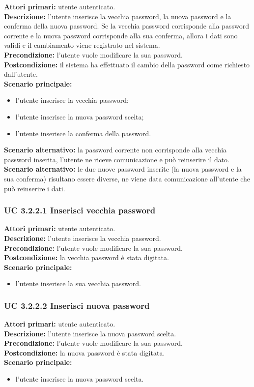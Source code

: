 \noindent
\textbf{Attori primari:} utente autenticato.\\
\textbf{Descrizione:} l'utente inserisce la vecchia password, la nuova password e la conferma della nuova password. Se la vecchia password corrisponde alla password corrente e la nuova password corrisponde alla sua conferma, allora i dati sono validi e il cambiamento viene registrato nel sistema.\\
\textbf{Precondizione:} l'utente vuole modificare la sua password.\\
\textbf{Postcondizione:} il sistema ha effettuato il cambio della password come richiesto dall'utente.\\
\textbf{Scenario principale:}
\begin{itemize}
\item l'utente inserisce la vecchia password;
\item l'utente inserisce la nuova password scelta;
\item l'utente inserisce la conferma della password.
\end{itemize}
\textbf{Scenario alternativo: }la password corrente non corrisponde alla vecchia password inserita, l'utente ne riceve comunicazione e può reinserire il dato.\\
\textbf{Scenario alternativo:} le due nuove password inserite (la nuova password e la sua conferma) risultano essere diverse, ne viene data comunicazione all'utente che può reinserire i dati.

\subsubsection{UC 3.2.2.1 Inserisci vecchia password}
\noindent
\textbf{Attori primari:} utente autenticato.\\
\textbf{Descrizione:} l'utente inserisce la vecchia password.\\
\textbf{Precondizione:} l'utente vuole modificare la sua password.\\
\textbf{Postcondizione:} la vecchia password è stata digitata.\\
\textbf{Scenario principale:}
\begin{itemize}
\item l'utente inserisce la sua vecchia password.
\end{itemize}

\subsubsection{UC 3.2.2.2 Inserisci nuova password}
\noindent
\textbf{Attori primari:} utente autenticato.\\
\textbf{Descrizione:} l'utente inserisce la nuova password scelta.\\
\textbf{Precondizione:} l'utente vuole modificare la sua password.\\
\textbf{Postcondizione:} la nuova password è stata digitata.\\
\textbf{Scenario principale:}
\begin{itemize}
\item l'utente inserisce la nuova password scelta.
\end{itemize}

